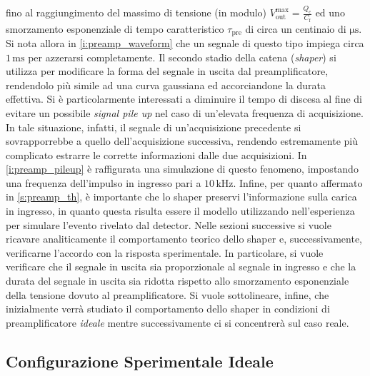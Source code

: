 \documentclass[a4paper,11pt]{article} %
\begin{document}
fino al raggiungimento del massimo di tensione (in modulo)
$V_{\text{out}}^{\text{max}}=\frac{Q_{\text{c}}}{C_{\text{f}}}$ ed uno smorzamento esponenziale di tempo caratteristico
$\tau_{\text{pre}}$ di circa un centinaio di $\si{\us}$. Si nota allora in \autoref{i:preamp_waveform} che un segnale di
questo tipo impiega circa $1\,\si{\milli\second}$ per azzerarsi completamente. Il secondo stadio della catena
(\textit{shaper}) si utilizza per modificare la forma del segnale in uscita dal preamplificatore, rendendolo più simile
ad una curva gaussiana ed accorciandone la durata effettiva. Si è particolarmente interessati a diminuire il tempo di
discesa al fine di evitare un possibile \textit{signal pile up} nel caso di un'elevata frequenza di acquisizione. In
tale situazione, infatti, il segnale di un'acquisizione precedente si sovrapporrebbe a quello
dell'acquisizione successiva, rendendo estremamente più complicato estrarre le corrette informazioni dalle due
acquisizioni. In \autoref{i:preamp_pileup} è raffigurata una simulazione di questo fenomeno, impostando una frequenza
dell'impulso in ingresso pari a $10\,\si{\kilo\Hz}$. Infine, per quanto affermato in \autoref{s:preamp_th}, è importante
che lo shaper preservi l'informazione sulla carica in ingresso, in quanto questa risulta essere il modello utilizzando
nell'esperienza per simulare l'evento rivelato dal detector. Nelle sezioni successive si vuole ricavare analiticamente
il comportamento teorico dello shaper e, successivamente, verificarne l'accordo con la risposta sperimentale. In
particolare, si vuole verificare che il segnale in uscita sia proporzionale al segnale in ingresso e che la durata del
segnale in uscita sia ridotta rispetto allo smorzamento esponenziale della tensione dovuto al preamplificatore. Si vuole
sottolineare, infine, che inizialmente verrà studiato il comportamento dello shaper in condizioni di preamplificatore
\textit{ideale} mentre successivamente ci si concentrerà sul caso reale.



\subsection{Configurazione Sperimentale Ideale}\label{s:shaper_config_ideale}
\end{document}
